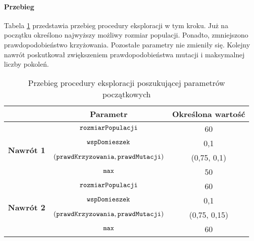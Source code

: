 \documentclass[./FM_mgr.tex]{subfiles}
\begin{document}
\paragraph{Przebieg}

Tabela \ref{table:knapsack_tweak_flow} przedstawia przebieg procedury eksploracji w tym kroku.
Już na początku określono najwyższy możliwy rozmiar populacji.
Ponadto, zmniejszono prawdopodobieństwo krzyżowania.
Pozostałe parametry nie zmieniły się.
Kolejny nawrót poskutkował zwiększeniem prawdopodobieństwa mutacji i maksymalnej liczby pokoleń.

\begin{table}[h]
	\caption{Przebieg procedury eksploracji poszukującej parametrów początkowych \label{table:knapsack_tweak_flow}}
	\centering
	\begin{tabular}{c|c|c|}
		\cline{2-3}
		& {\bf Parametr}                                     & {\bf Określona wartość} \\ \hline
		\multicolumn{1}{|c|}{\multirow{4}{*}{{\bf Nawrót 1}}} & $\mathtt{rozmiarPopulacji}$                         & 60                      \\ \cline{2-3} 
		\multicolumn{1}{|c|}{}                                & $\mathtt{wspDomieszek}$                             & 0,1                     \\ \cline{2-3} 
		\multicolumn{1}{|c|}{}                                & $(\mathtt{prawdKrzyzowania}, \mathtt{prawdMutacji})$ & (0,75, 0,1)             \\ \cline{2-3} 
		\multicolumn{1}{|c|}{}                                & $\mathtt{max}$                                      & 50                     \\ \hline \hline
		\multicolumn{1}{|c|}{\multirow{4}{*}{{\bf Nawrót 2}}} & $\mathtt{rozmiarPopulacji}$                         & 60                      \\ \cline{2-3} 
		\multicolumn{1}{|c|}{}                                & $\mathtt{wspDomieszek}$                             & 0,1                     \\ \cline{2-3} 
		\multicolumn{1}{|c|}{}                                & $(\mathtt{prawdKrzyzowania}, \mathtt{prawdMutacji})$ & (0,75, 0,15)             \\ \cline{2-3} 
		\multicolumn{1}{|c|}{}                                & $\mathtt{max}$                                      & 60                     \\ \hline
	\end{tabular}
\end{table}	
\end{document}
